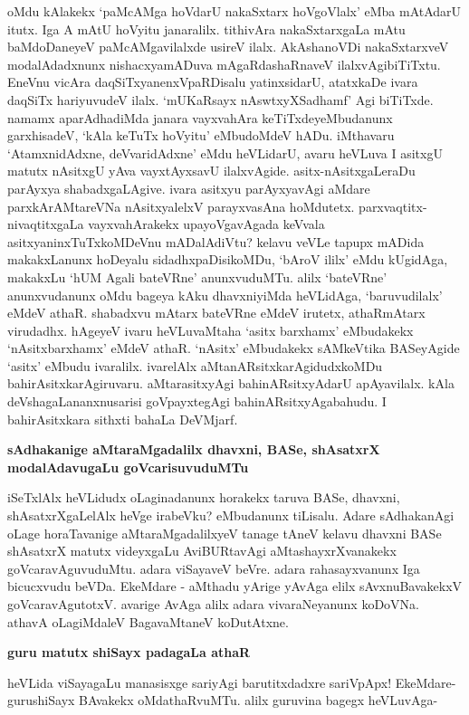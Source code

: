 oMdu kAlakekx `paMcAMga hoVdarU nakaSxtarx hoVgoVlalx' eMba mAtAdarU itutx. Iga A mAtU hoVyitu janaralilx. tithivAra nakaSxtarxgaLa mAtu baMdoDaneyeV paMcAMgavilalxde usireV ilalx. AkAshanoVDi nakaSxtarxveV modalAdadxnunx nishacxyamADuva mAgaRdashaRnaveV ilalxvAgibiTiTxtu. EneVnu vicAra daqSiTxyanenxVpaRDisalu yatinxsidarU, atatxkaDe ivara daqSiTx hariyuvudeV ilalx. `mUKaRsayx nAswtxyXSadhamf'\label{189} Agi biTiTxde. namamx aparAdhadiMda janara vayxvahAra keTiTxdeyeMbudanunx garxhisadeV, `kAla keTuTx hoVyitu' eMbudoMdeV hADu. iMthavaru `AtamxnidAdxne, deVvaridAdxne' eMdu heVLidarU, avaru heVLuva I asitxgU matutx nAsitxgU yAva vayxtAyxsavU ilalxvAgide. asitx-nAsitxgaLeraDu parAyxya shabadxgaLAgive. ivara asitxyu parAyxyavAgi aMdare parxkArAMtareVNa nAsitxyalelxV parayxvasAna hoMdutetx. parxvaqtitx-nivaqtitxgaLa vayxvahArakekx upayoVgavAgada keVvala asitxyaninxTuTxkoMDeVnu mADalAdiVtu? kelavu veVLe tapupx mADida makakxLanunx hoDeyalu sidadhxpaDisikoMDu, `bAroV ililx' eMdu kUgidAga, makakxLu `hUM Agali bateVRne' anunxvuduMTu. alilx `bateVRne' anunxvudanunx oMdu bageya kAku dhavxniyiMda heVLidAga, `baruvudilalx' eMdeV athaR. shabadxvu mAtarx bateVRne eMdeV irutetx, athaRmAtarx virudadhx. hAgeyeV ivaru heVLuvaMtaha `asitx barxhamx' eMbudakekx `nAsitxbarxhamx' eMdeV athaR. `nAsitx' eMbudakekx sAMkeVtika BASeyAgide `asitx' eMbudu ivaralilx. ivarelAlx aMtanARsitxkarAgidudxkoMDu bahirAsitxkarAgiruvaru. aMtarasitxyAgi bahinARsitxyAdarU apAyavilalx. kAla deVshagaLananxnusarisi goVpayxtegAgi bahinARsitxyAgabahudu. I bahirAsitxkara sithxti bahaLa DeVMjarf.

\noindent
{\bf\large{sAdhakanige aMtaraMgadalilx dhavxni, BASe, shAsatxrX modalAdavugaLu goVcarisuvuduMTu}}\label{page189}

iSeTxlAlx heVLidudx oLaginadanunx horakekx taruva BASe, dhavxni, shAsatxrXgaLelAlx heVge irabeVku? eMbudanunx tiLisalu. Adare sAdhakanAgi oLage horaTavanige aMtaraMgadalilxyeV tanage tAneV kelavu dhavxni BASe shAsatxrX matutx videyxgaLu AviBURtavAgi aMtashayxrXvanakekx goVcaravAguvuduMtu. adara viSayaveV beVre. adara rahasayxvanunx Iga bicucxvudu beVDa. EkeMdare - aMthadu yArige yAvAga elilx sAvxnuBavakekxV goVcaravAgutotxV. avarige AvAga alilx adara vivaraNeyanunx koDoVNa. athavA oLagiMdaleV BagavaMtaneV koDutAtxne.

\noindent
{\bf\large{guru matutx shiSayx padagaLa athaR}}\label{page190}

heVLida viSayagaLu manasisxge sariyAgi barutitxdadxre sariVpApx! EkeMdare- gurushiSayx BAvakekx oMdathaRvuMTu. alilx guruvina bagegx heVLuvAga-

